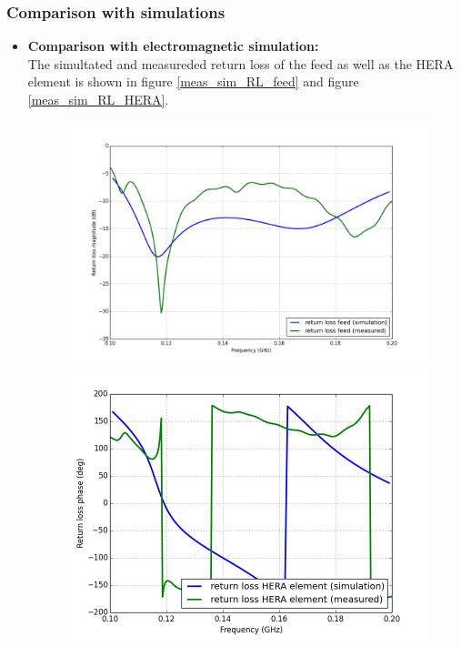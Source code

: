 \documentclass[twocolumn]{emulateapj}
\begin{document}
\subsubsection{\textbf{Comparison with simulations}}
\begin{itemize}
\item 
\textbf{Comparison with electromagnetic simulation:}\\
The simultated and measureded return loss of the feed as well as the HERA element is shown in figure \ref{meas_sim_RL_feed} and figure \ref{meas_sim_RL_HERA}.
\begin{figure}[ht]
\begin{minipage}[b]{\linewidth}
\centering
\includegraphics[angle=0, width=\linewidth]{plots/feed_meas_sim_mag.png}
\end{minipage}
\vspace{0.1cm}
\begin{minipage}[b]{\linewidth}
\centering
\includegraphics[angle=0, width=\linewidth]{plots/feed_meas_sim_ph.png}

\end{minipage}
\end{figure}
\end{itemize}
\end{document}
